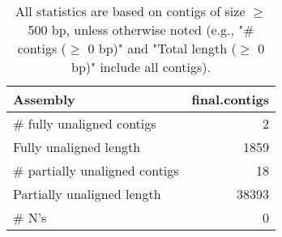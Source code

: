 \documentclass[12pt,a4paper]{article}
\begin{document}
\begin{table}[ht]
\begin{center}
\caption{All statistics are based on contigs of size $\geq$ 500 bp, unless otherwise noted (e.g., "\# contigs ($\geq$ 0 bp)" and "Total length ($\geq$ 0 bp)" include all contigs).}
\begin{tabular}{|l*{1}{|r}|}
\hline
Assembly & final.contigs \\ \hline
\# fully unaligned contigs & 2 \\ \hline
Fully unaligned length & 1859 \\ \hline
\# partially unaligned contigs & 18 \\ \hline
Partially unaligned length & 38393 \\ \hline
\# N's & 0 \\ \hline
\end{tabular}
\end{center}
\end{table}
\end{document}
